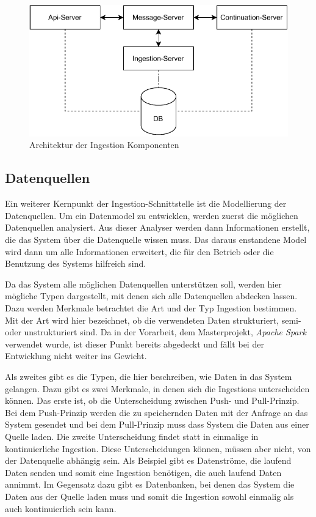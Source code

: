\begin{figure}
  \centering
  \includegraphics{Grafiken/ingestion-arch.pdf}
  \caption{Architektur der Ingestion Komponenten}
  \label{fig:ingestion_arch}
\end{figure}


\subsection{Datenquellen}
Ein weiterer Kernpunkt der Ingestion-Schnittstelle ist die Modellierung der Datenquellen.
Um ein Datenmodel zu entwicklen, werden zuerst die möglichen Datenquellen analysiert.
Aus dieser Analyser werden dann Informationen erstellt, die das System über die Datenquelle wissen muss.
Das daraus enstandene Model wird dann um alle Informationen erweitert, die für den Betrieb oder die Benutzung des Systems hilfreich sind.

Da das System alle möglichen Datenquellen unterstützen soll, werden hier mögliche Typen dargestellt, mit denen sich alle Datenquellen abdecken lassen.
Dazu werden Merkmale betrachtet die Art und der Typ Ingestion bestimmen.
Mit der Art wird hier bezeichnet, ob die verwendeten Daten strukturiert, semi- oder unstrukturiert sind.
Da in der Vorarbeit, dem Masterprojekt, \textit{Apache Spark} verwendet wurde, ist dieser Punkt bereits abgedeckt und fällt bei der Entwicklung nicht weiter ins Gewicht.

Als zweites gibt es die Typen, die hier beschreiben, wie Daten in das System gelangen.
Dazu gibt es zwei Merkmale, in denen sich die Ingestions unterscheiden können.
Das erste ist, ob die Unterscheidung zwischen Push- und Pull-Prinzip.
Bei dem Push-Prinzip werden die zu speichernden Daten mit der Anfrage an das System gesendet und bei dem Pull-Prinzip muss dass System die Daten aus einer Quelle laden.
Die zweite Unterscheidung findet statt in einmalige in kontinuierliche Ingestion.
Diese Unterscheidungen können, müssen aber nicht, von der Datenquelle abhängig sein.
Als Beispiel gibt es Datenströme, die laufend Daten senden und somit eine Ingestion benötigen, die auch laufend Daten annimmt.
Im Gegensatz dazu gibt es Datenbanken, bei denen das System die Daten aus der Quelle laden muss und somit die Ingestion sowohl einmalig als auch kontinuierlich sein kann.


